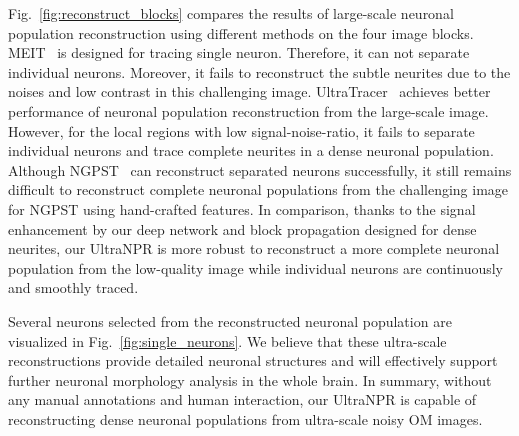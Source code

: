 Fig.~\ref{fig:reconstruct_blocks} compares the results of large-scale neuronal population reconstruction using different methods on the four image blocks. 
%
MEIT~\cite{Wang2018} is designed for tracing single neuron. Therefore, it can not separate individual neurons. 
Moreover, it fails to reconstruct the subtle neurites due to the noises and low contrast in this challenging image.
UltraTracer~\cite{Peng2017} achieves better performance of neuronal population reconstruction from the large-scale image. 
However, for the local regions with low signal-noise-ratio, it fails to separate individual neurons and trace complete neurites in a dense neuronal population.
Although NGPST~\cite{Quan2015} can reconstruct separated neurons successfully, it still remains difficult to reconstruct complete neuronal populations from the challenging image for NGPST using hand-crafted features.
In comparison, thanks to the signal enhancement by our deep network and block propagation designed for dense neurites, our UltraNPR is more robust to reconstruct a more complete neuronal population from the low-quality image while individual neurons are continuously and smoothly traced.



Several neurons selected from the reconstructed neuronal population are visualized in Fig.~\ref{fig:single_neurons}. 
We believe that these ultra-scale reconstructions provide detailed neuronal structures and will effectively support further neuronal morphology analysis in the whole brain. 
In summary, without any manual annotations and human interaction, our UltraNPR is capable of reconstructing dense neuronal populations from ultra-scale noisy OM images. 
